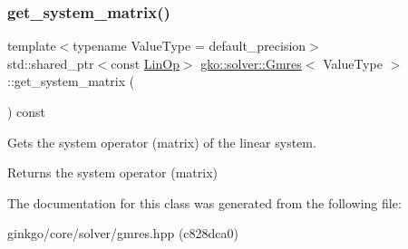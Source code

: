\mbox{\label{classgko_1_1solver_1_1Gmres_a31d5c0225dbed72e52ea252dd38868f2}} 
\subsubsection{\texorpdfstring{get\+\_\+system\+\_\+matrix()}{get\_system\_matrix()}}
{\footnotesize\ttfamily template$<$typename Value\+Type  = default\+\_\+precision$>$ \\
std\+::shared\+\_\+ptr$<$const \hyperlink{classgko_1_1LinOp}{Lin\+Op}$>$ \hyperlink{classgko_1_1solver_1_1Gmres}{gko\+::solver\+::\+Gmres}$<$ Value\+Type $>$\+::get\+\_\+system\+\_\+matrix (\begin{DoxyParamCaption}{ }\end{DoxyParamCaption}) const}



Gets the system operator (matrix) of the linear system. 

\begin{DoxyReturn}{Returns}
the system operator (matrix) 
\end{DoxyReturn}


The documentation for this class was generated from the following file\+:\begin{DoxyCompactItemize}
\item 
ginkgo/core/solver/gmres.\+hpp (c828dca0)\end{DoxyCompactItemize}

